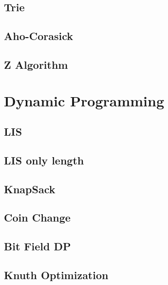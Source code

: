 \documentclass[10pt,landscape,a4paper,twocolumn]{article}
\begin{document}
\subsection{Trie}


\subsection{Aho-Corasick}


\subsection{Z Algorithm}


\section {Dynamic Programming}

\subsection{LIS}


\subsection{LIS only length}


\subsection{KnapSack}


\subsection{Coin Change}


\subsection{Bit Field DP}


\subsection{Knuth Optimization}

\end{document}
